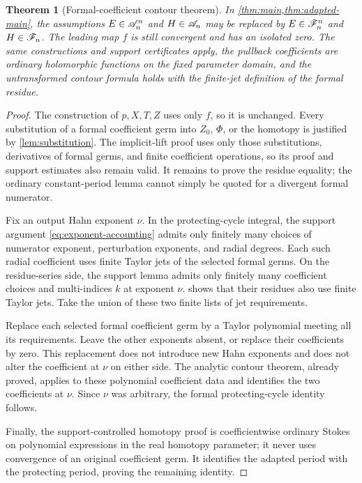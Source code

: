 \documentclass[11pt,letterpaper]{article}
\newtheorem{theorem}{Theorem}[section]
\theoremstyle{definition}
\theoremstyle{remark}
\numberwithin{equation}{section}
\begin{document}
\begin{theorem}[Formal-coefficient contour theorem]\label{thm:formal}
In \cref{thm:main,thm:adapted-main}, the assumptions
$E\in\mathscr A_n^n$ and $H\in\mathscr A_n$ may be replaced by
$E\in\mathscr F_n^n$ and $H\in\mathscr F_n$. The leading map $f$ is still convergent
and has an isolated zero. The same constructions and support certificates
apply, the pullback coefficients are ordinary holomorphic functions on the
fixed parameter domain, and the untransformed contour formula holds with the
finite-jet definition of the formal residue.
\end{theorem}
\begin{proof}
The construction of $p,X,T,Z$ uses only $f$, so it is unchanged. Every
substitution of a formal coefficient germ into $Z_0$, $\Phi$, or the
homotopy is justified by \cref{lem:substitution}. The implicit-lift proof
uses only those substitutions, derivatives of formal germs, and finite
coefficient operations, so its proof and support estimates also remain valid.
It remains to prove the residue equality; the ordinary constant-period lemma
cannot simply be quoted for a divergent formal numerator.

Fix an output Hahn exponent $\nu$. In the protecting-cycle integral, the
support argument \eqref{eq:exponent-accounting} admits only finitely many choices
of numerator exponent, perturbation exponents, and radial degrees. Each such
radial coefficient uses finite Taylor jets of the selected formal germs.
On the residue-series side, the support lemma admits only finitely many
coefficient choices and multi-indices $k$ at exponent $\nu$.
 shows that their residues also use finite Taylor jets.
Take the union of these two finite lists of jet requirements.

Replace each selected formal coefficient germ by a Taylor polynomial meeting
all its requirements. Leave the other exponents absent, or replace their
coefficients by zero. This replacement does not introduce new Hahn exponents
and does not alter the coefficient at $\nu$ on either side. The analytic
contour theorem, already proved, applies to these polynomial coefficient data
and identifies the two coefficients at $\nu$. Since $\nu$ was arbitrary,
the formal protecting-cycle identity follows.

Finally, the support-controlled homotopy proof is coefficientwise ordinary
Stokes on polynomial expressions in the real homotopy parameter; it never
uses convergence of an original coefficient germ. It identifies the adapted
period with the protecting period, proving the remaining identity.
\end{proof}
\end{document}

